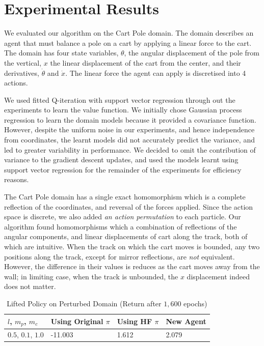 \section{Experimental Results}
\label{sec:hf:experiments}


We evaluated our algorithm on the Cart Pole domain. The domain
describes an agent that must balance a pole on a cart by applying
a linear force to the cart. The domain has four state variables,
$\theta$, the angular displacement of the pole from the vertical, $x$
the linear displacement of the cart from the center, and their
derivatives, $\dot{\theta}$ and $\dot{x}$. The linear force the agent
can apply is discretised into 4 actions. 

We used fitted Q-iteration with support vector regression through out
the experiments to learn the value function. We initially chose Gaussian
process regression to learn the domain models because it provided
a covariance function. However, despite the uniform noise in our
experiments, and hence independence from coordinates, the learnt models
did not accurately predict the variance, and led to greater variability
in performance.  We decided to omit the contribution of variance to the
gradient descent updates, and used the models learnt using support
vector regression for the remainder of the experiments for efficiency
reasons.

The Cart Pole domain has a single exact homomorphism which is a complete
reflection of the coordinates, and reversal of the forces applied. Since
the action space is discrete, we also added {\em an action permutation}
to each particle. Our algorithm found homomorphisms which a combination
of reflections of the angular components, and linear displacements of
cart along the track, both of which are intuitive. When the track on
which the cart moves is bounded, any two positions along the track,
except for mirror reflections, are {\em not} equivalent. However, the
difference in their values is reduces as the cart moves away from the
wall; in limiting case, when the track is unbounded, the $x$
displacement indeed does not matter. 

\begin{table}[hbtp]
  \centering
  \begin{tabular}{llll}
  \toprule
  \bfseries $l$, $m_p$, $m_c$ & \bfseries Using Original $\pi$ & \bfseries Using HF $\pi$ & \bfseries New Agent  \\
  \midrule
   $0.5$, $0.1$, $1.0$ & -11.003 & 1.612 & 2.079 \\
  \bottomrule
  \end{tabular}
  \caption{Lifted Policy on Perturbed Domain (Return after $1,600$ epochs)}
  \label{tbl:perturbed-values}
\end{table}

